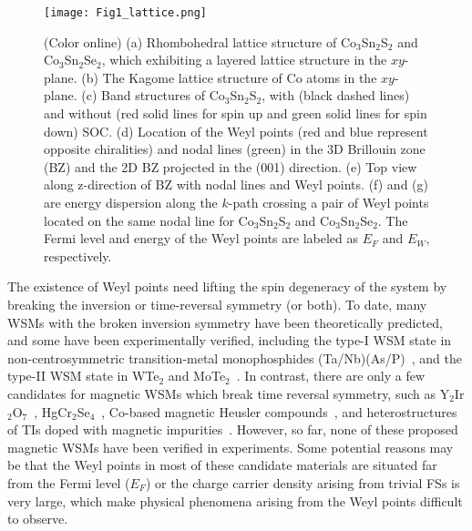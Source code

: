 \documentclass[aps,prb,reprint,superscriptaddress,amssymb,amsmath]{revtex4-1}
\begin{document}
\begin{figure*}[htb]
\centering
\texttt{[image: Fig1\_lattice.png]}
   \caption{
(Color online) (a) Rhombohedral lattice structure of Co$_3$Sn$_2$S$_2$ and Co$_3$Sn$_2$Se$_2$, which exhibiting a layered lattice structure in the $xy$-plane. 
(b) The Kagome lattice structure of Co atoms in the $xy$-plane.
(c) Band structures of Co$_3$Sn$_2$S$_2$, with (black dashed lines) and without (red solid lines for spin up and green solid lines for spin down) SOC. 
(d) Location of the Weyl points (red and blue represent opposite chiralities) and nodal lines (green) in the 3D Brillouin zone (BZ) and the 2D BZ projected in the (001) direction. 
(e) Top view along z-direction of BZ with nodal lines and Weyl points.
(f) and (g) are energy dispersion along the $k$-path crossing a pair of Weyl points located on the same nodal line for Co$_3$Sn$_2$S$_2$ and Co$_3$Sn$_2$Se$_2$.
The Fermi level and energy of the Weyl points are labeled as $E_F$ and $E_W$, respectively.
}
\label{fig:lattice}
\end{figure*}

The existence of Weyl points need lifting the spin degeneracy of the system by breaking the inversion or time-reversal symmetry (or both). 
To date, many WSMs with the broken inversion symmetry have been theoretically predicted, 
and some have been experimentally verified, 
including the type-I WSM state in non-centrosymmetric transition-metal monophosphides (Ta/Nb)(As/P)~\cite{Xu2015TaAs,Lv2015TaAs,Yang2015TaAs,Liu2016NbPTaP,Xu2015NbAs,Belopolski2016NbP,Xu2016TaP,Souma2015NbP,Inoue2016, Batabyal2016, Zheng2016,Huang2015anomaly,Zhang2016ABJ,Wang2015NbP,Niemann2017},
and the type-II WSM state in WTe$_2$ and MoTe$_2$~\cite{Soluyanov2015WTe2,Sun2015MoTe2,Deng2016,Jiang2016,Liang2016,Huang2016}. 
In contrast, there are only a few candidates for magnetic WSMs which break time reversal symmetry, 
such as Y$_2$Ir$_2$O$_7$~\cite{Wan2011}, HgCr$_2$Se$_4$~\cite{Xu2011}, 
Co-based magnetic Heusler compounds~\cite{Wang_Heusler_2016,Chang2016,Kubler2016}, 
and heterostructures of TIs doped with magnetic impurities~\cite{Burkov:2011de}. 
However, so far, none of these proposed magnetic WSMs have been verified in experiments. 
Some potential reasons may be that the Weyl points in most of these candidate materials are situated far from the Fermi level ($E_F$) 
or the charge carrier density arising from trivial FSs is very large, 
which make physical phenomena arising from the Weyl points difficult to observe.
\end{document}
